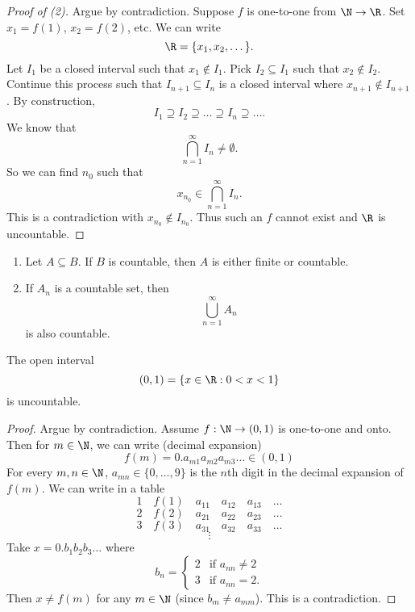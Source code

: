 \begin{proof}[Proof of (2)]
  Argue by contradiction. Suppose $f$ is one-to-one from
  $\N \to \R$.
  Set $x_1 = f(1)$, $x_2 = f(2)$, etc. We can write
  \[\R = \{x_1, x_2, \dots\}.\]
  Let $I_1$ be a closed interval such that
  $x_1 \notin I_1$. Pick $I_2 \subseteq I_1$ such that
  $x_2 \notin I_2$. Continue this process such that
  $I_{n+1} \subseteq I_n$ is a closed interval where
  $x_{n+1} \notin I_{n+1}$.
  By construction,
  \[I_1 \supseteq I_2 \supseteq \dots \supseteq I_n \supseteq \dots.\]
  We know that
  \[\bigcap_{n = 1}^\infty I_n \ne \emptyset.\]
  So we can find $n_0$ such that
  \[x_{n_0} \in \bigcap_{n = 1}^\infty I_n.\]
  This is a contradiction with $x_{n_0} \notin I_{n_0}$.
  Thus such an $f$ cannot exist and $\R$ is
  uncountable.
\end{proof}

\begin{theorem}\leavevmode
  \begin{enumerate}
    \item Let $A \subseteq B$. If $B$ is countable, then
      $A$ is either finite or countable.
    \item If $A_n$ is a countable set, then
      \[\bigcup_{n=1}^\infty A_n\]
      is also countable.
  \end{enumerate}
\end{theorem}

\begin{theorem}
  The open interval
  \[(0, 1) = \{x \in \R : 0 < x < 1\}\]
  is uncountable.
\end{theorem}

\begin{proof}
  Argue by contradiction. Assume $f : \N \to (0, 1)$
  is one-to-one and onto. Then for $m \in \N$,
  we can write (decimal expansion)
  \[f(m) = 0.a_{m1}a_{m2}a_{m3}\ldots \in (0, 1)\]
  For every $m, n \in \N$, $a_{mn} \in \{0, \dots, 9\}$
  is the $n$th digit in the decimal expansion of
  $f(m)$. We can write in a table
  \[1 \quad f(1) \quad a_{11} \quad a_{12} \quad a_{13} \quad \dots\]
  \[2 \quad f(2) \quad a_{21} \quad a_{22} \quad a_{23} \quad \dots\]
  \[3 \quad f(3) \quad a_{31} \quad a_{32} \quad a_{33} \quad \dots\]
  \[\vdots\]
  Take $x = 0.b_1b_2b_3\ldots$ where
  \[
    b_n =
    \begin{cases}
      2 & \text{if $a_{nn} \ne 2$} \\
      3 & \text{if $a_{nn} = 2$}.
    \end{cases}
  \]
  Then $x \ne f(m)$ for any $m \in \N$
  (since $b_m \ne a_{mm}$). This is a
  contradiction.
\end{proof}
